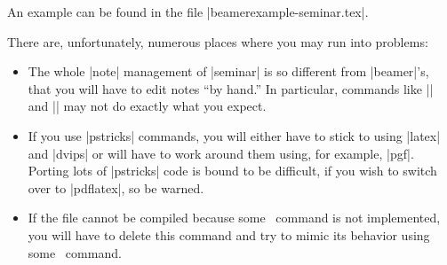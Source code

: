 An example can be found in the file |beamerexample-seminar.tex|.

There are, unfortunately, numerous places where you may run into problems:
\begin{itemize}
\item
  The whole |note| management of |seminar| is so different from |beamer|'s, that you will have to edit notes ``by hand.'' In particular, commands like |\ifslidesonly| and |\ifslide| may not do exactly what you expect.
\item
  If you use |pstricks| commands, you will either have to stick to using |latex| and |dvips| or will have to work around them using, for example, |pgf|. Porting lots of |pstricks| code is bound to be difficult, if you wish to switch over to |pdflatex|, so be warned.
\item
  If the file cannot be compiled because some \seminar\ command is not implemented, you will have to delete this command and try to mimic its behavior using some \beamer\ command.
\end{itemize}

